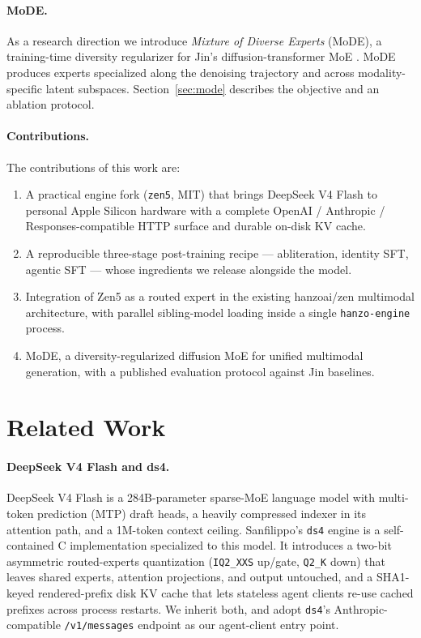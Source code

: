 \documentclass[11pt,a4paper]{article}
\begin{document}
\paragraph{MoDE.} As a research direction we introduce \emph{Mixture of Diverse Experts} (MoDE),
a training-time diversity regularizer for Jin's diffusion-transformer MoE \cite{jin}. MoDE produces
experts specialized along the denoising trajectory and across modality-specific latent
subspaces. Section~\ref{sec:mode} describes the objective and an ablation protocol.

\paragraph{Contributions.} The contributions of this work are:

\begin{enumerate}
  \item A practical engine fork (\texttt{zen5}, MIT) that brings DeepSeek V4 Flash to personal Apple
        Silicon hardware with a complete OpenAI / Anthropic / Responses-compatible HTTP surface and
        durable on-disk KV cache.
  \item A reproducible three-stage post-training recipe --- abliteration, identity SFT, agentic SFT ---
        whose ingredients we release alongside the model.
  \item Integration of Zen5 as a routed expert in the existing hanzoai/zen multimodal architecture,
        with parallel sibling-model loading inside a single \texttt{hanzo-engine} process.
  \item MoDE, a diversity-regularized diffusion MoE for unified multimodal generation, with a published
        evaluation protocol against Jin baselines.
\end{enumerate}

\section{Related Work}
\label{sec:related}

\paragraph{DeepSeek V4 Flash and ds4.} DeepSeek V4 Flash \cite{deepseekv4flash} is a 284B-parameter
sparse-MoE language model with multi-token prediction (MTP) draft heads, a heavily compressed indexer
in its attention path, and a 1M-token context ceiling. Sanfilippo's \texttt{ds4} engine
\cite{antirez-ds4} is a self-contained C implementation specialized to this model. It introduces a
two-bit asymmetric routed-experts quantization (\texttt{IQ2\_XXS} up/gate, \texttt{Q2\_K} down) that
leaves shared experts, attention projections, and output untouched, and a SHA1-keyed rendered-prefix
disk KV cache that lets stateless agent clients re-use cached prefixes across process restarts. We
inherit both, and adopt \texttt{ds4}'s Anthropic-compatible \texttt{/v1/messages} endpoint as our
agent-client entry point.
\end{document}
